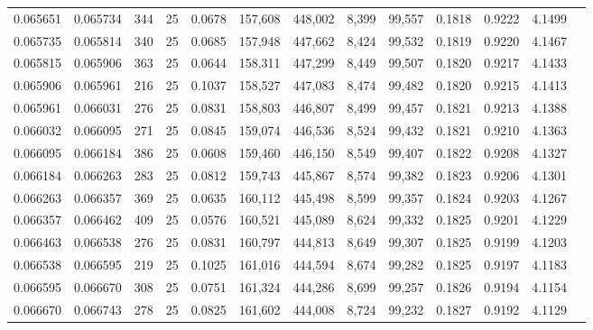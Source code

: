 \begin{tabular}{rrrrrrrrrrrrr}
0.065651 & 0.065734 &   344 &  25 &                                     0.0678 & 157,608 & 448,002 &   8,399 &  99,557 & 0.1818 & 0.9222 & 4.1499 \\
0.065735 & 0.065814 &   340 &  25 &                                     0.0685 & 157,948 & 447,662 &   8,424 &  99,532 & 0.1819 & 0.9220 & 4.1467 \\
0.065815 & 0.065906 &   363 &  25 &                                     0.0644 & 158,311 & 447,299 &   8,449 &  99,507 & 0.1820 & 0.9217 & 4.1433 \\
0.065906 & 0.065961 &   216 &  25 &                                     0.1037 & 158,527 & 447,083 &   8,474 &  99,482 & 0.1820 & 0.9215 & 4.1413 \\
0.065961 & 0.066031 &   276 &  25 &                                     0.0831 & 158,803 & 446,807 &   8,499 &  99,457 & 0.1821 & 0.9213 & 4.1388 \\
0.066032 & 0.066095 &   271 &  25 &                                     0.0845 & 159,074 & 446,536 &   8,524 &  99,432 & 0.1821 & 0.9210 & 4.1363 \\
0.066095 & 0.066184 &   386 &  25 &                                     0.0608 & 159,460 & 446,150 &   8,549 &  99,407 & 0.1822 & 0.9208 & 4.1327 \\
0.066184 & 0.066263 &   283 &  25 &                                     0.0812 & 159,743 & 445,867 &   8,574 &  99,382 & 0.1823 & 0.9206 & 4.1301 \\
0.066263 & 0.066357 &   369 &  25 &                                     0.0635 & 160,112 & 445,498 &   8,599 &  99,357 & 0.1824 & 0.9203 & 4.1267 \\
0.066357 & 0.066462 &   409 &  25 &                                     0.0576 & 160,521 & 445,089 &   8,624 &  99,332 & 0.1825 & 0.9201 & 4.1229 \\
0.066463 & 0.066538 &   276 &  25 &                                     0.0831 & 160,797 & 444,813 &   8,649 &  99,307 & 0.1825 & 0.9199 & 4.1203 \\
0.066538 & 0.066595 &   219 &  25 &                                     0.1025 & 161,016 & 444,594 &   8,674 &  99,282 & 0.1825 & 0.9197 & 4.1183 \\
0.066595 & 0.066670 &   308 &  25 &                                     0.0751 & 161,324 & 444,286 &   8,699 &  99,257 & 0.1826 & 0.9194 & 4.1154 \\
0.066670 & 0.066743 &   278 &  25 &                                     0.0825 & 161,602 & 444,008 &   8,724 &  99,232 & 0.1827 & 0.9192 & 4.1129 \\

\end{tabular}
